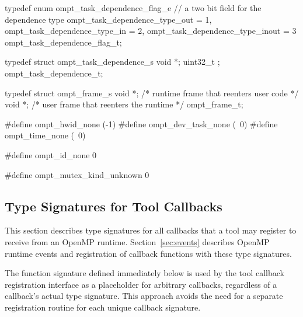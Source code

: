 \documentclass{article}
\begin{document}
\begin{boxedcode}
typedef enum ompt\_task\_dependence\_flag\_e {
  // a two bit field for the dependence type
  ompt\_task\_dependence\_type\_out       = 1,
  ompt\_task\_dependence\_type\_in        = 2,
  ompt\_task\_dependence\_type\_inout     = 3
} ompt\_task\_dependence\_flag\_t;

typedef struct ompt\_task\_dependence\_s {
  void *;
  uint32\_t  ;
} ompt\_task\_dependence\_t;

typedef struct ompt\_frame\_s {
  void *;                           /* runtime frame that reenters user code       */
  void *;                          /* user frame that reenters the runtime        */
} ompt\_frame\_t;

#define ompt\_hwid\_none                (-1)
#define ompt\_dev\_task\_none            (~0)
#define ompt\_time\_none                (~0)

#define ompt\_id\_none                  0

#define ompt\_mutex\_kind\_unknown       0
\end{boxedcode}
\clearpage

\subsection{Type Signatures for Tool Callbacks}
\label{appendix:ompt-types:callbacks}
This section describes type signatures for all  callbacks that a tool may register to receive from an OpenMP runtime. Section~\ref{sec:events} describes OpenMP runtime events and registration of
callback functions with these type signatures.

The function signature   defined immediately below is used by the tool callback registration interface as a placeholder for arbitrary callbacks,
 regardless of a callback's actual type signature. This approach avoids the need for a separate registration routine for each unique callback signature. 
\end{document}
